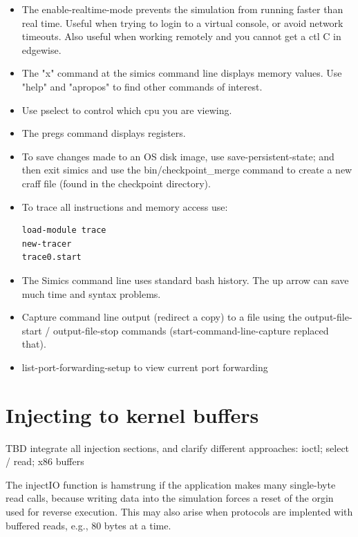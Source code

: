 \documentclass[titlepage]{article}
\begin{document}
\begin{appendices}
\begin{itemize}
\item The enable-realtime-mode prevents the simulation from running faster than real time.  Useful when trying to login
to a virtual console, or avoid network timeouts.  Also useful when working remotely and you cannot get a ctl C in 
edgewise.

\item The "x" command at the simics command line displays memory values.  Use "help" and "apropos" to find other commands of interest.

\item Use pselect to control which cpu you are viewing.

\item The pregs command displays registers.  

\item To save changes made to an OS disk image, use save-persistent-state; and then exit simics and use the bin/checkpoint\_merge command
to create a new craff file (found in the checkpoint directory).

\item To trace all instructions and memory access use:
\begin{verbatim}
load-module trace
new-tracer
trace0.start
\end{verbatim}

\item The Simics command line uses standard bash history.  The up arrow can save much time and syntax problems.

\item Capture command line output (redirect a copy) to a file using the output-file-start / output-file-stop commands
(start-command-line-capture replaced that).

\item {list-port-forwarding-setup} to view current port forwarding
\end{itemize}

\section{Injecting to kernel buffers}
TBD integrate all injection sections, and clarify different approaches: ioctl; select / read; x86 buffers

The injectIO function is hamstrung if the application makes many single-byte read calls, because writing data into the
simulation forces a reset of the orgin used for reverse execution.  This may also arise when protocols are implented
with buffered reads, e.g., 80 bytes at a time.


\end{appendices}
\end{document}

